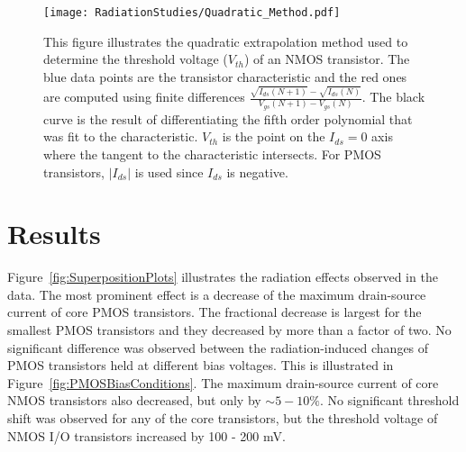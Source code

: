 \begin{figure}[htb!]
\begin{center}
\texttt{[image: RadiationStudies/Quadratic\_Method.pdf]}
\end{center}
\caption{This figure illustrates the quadratic extrapolation method used to determine the threshold voltage ($V_{th}$) of an NMOS transistor. The blue data points are the transistor characteristic and the red ones are computed using finite differences $\frac{\sqrt{I_{ds}(N+1)}-\sqrt{I_{ds}(N)}}{V_{gs}(N+1)-V_{gs}(N)}$. The black curve is the result of differentiating the fifth order polynomial that was fit to the characteristic. $V_{th}$ is the point on the $I_{ds}=0$ axis where the tangent to the characteristic intersects. For PMOS transistors, $|I_{ds}|$ is used since $I_{ds}$ is negative.}
\label{fig:QuadraticMethod}
\end{figure}

\section{Results}

Figure~\ref{fig:SuperpositionPlots}  illustrates the radiation effects observed in the data.  The most prominent effect is a decrease of the maximum drain-source current of core PMOS transistors.  The fractional decrease is largest for the smallest PMOS transistors and they decreased by more than a factor of two.  No significant difference was observed between the radiation-induced changes of PMOS transistors held at different bias voltages. This is illustrated in Figure~\ref{fig:PMOSBiasConditions}. The maximum drain-source current of core NMOS transistors also decreased, but only by $\sim5-10\%$.  No significant threshold shift was observed for any of the core transistors, but the threshold voltage of NMOS I/O transistors increased by 100 - 200 mV.  


